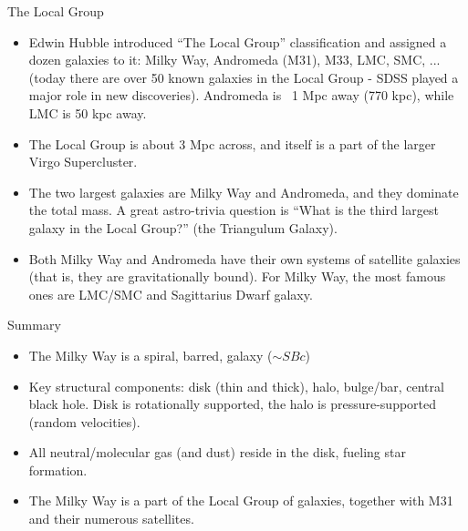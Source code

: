 \documentclass[letterpaper,landscape]{slides}
\begin{document}
\begin{slide}
\begin{center}
{\large \color{red}  The Local Group }
\end{center}

\begin{itemize}
\item Edwin Hubble introduced ``The Local Group'' classification and assigned a dozen galaxies to
it: Milky Way, Andromeda (M31), M33, LMC, SMC, ... (today there are over 50 known galaxies 
in the Local Group - SDSS played a major role in new discoveries). Andromeda is ~1 Mpc
away (770 kpc), while LMC is 50 kpc away. 

\item The Local Group is about 3 Mpc across, and itself is a part of the larger Virgo Supercluster.

\item The two largest galaxies are Milky Way and Andromeda, and they dominate the total mass. 
A great astro-trivia question is ``What is the third largest galaxy in the Local Group?''  
(the Triangulum Galaxy).

\item Both Milky Way and Andromeda have their own systems of satellite galaxies (that is, they
are gravitationally bound). For Milky Way, the most famous ones are LMC/SMC and 
Sagittarius Dwarf galaxy. 

\end{itemize}  

\begin{center}
 {}     
\end{center}

\vfill
\end{slide}


\begin{slide}
	\begin{center}
		{\large \color{red}  Summary }
	\end{center}
	
	\begin{itemize}
		\item The Milky Way is a spiral, barred, galaxy ($\sim SBc$)

		\item Key structural components: disk (thin and thick), halo, bulge/bar, central black hole. Disk is rotationally supported, the halo is pressure-supported (random velocities).

		\item All neutral/molecular gas (and dust) reside in the disk, fueling star formation.

		\item The Milky Way is a part of the Local Group of galaxies, together with M31 and their numerous satellites.
		
	\end{itemize}  
		
	\vfill
\end{slide}
\end{document}
